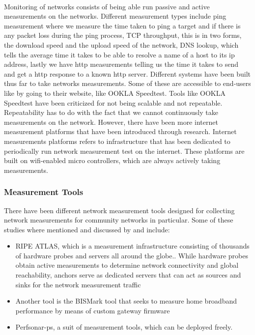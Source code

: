 \paragraph{}
Monitoring of networks consists of being able run passive and active measurements on the networks.
Different measurement types include ping measurement where we measure the time taken to ping a target and if there is any packet loss during the ping process, TCP throughput, this is in two forms, the download speed and the upload speed of the network, DNS lookup, which tells the average time it takes to be able to resolve a name of a host to its ip address, lastly we have http measurements telling us the time it takes to send and get a http response to a known http server.
Different systems have been built thus far to take networks measurements.
Some of these are accessible to end-users like by going to their website, like OOKLA Speedtest\cite{7523537}.
Tools like OOKLA Speedtest have been criticized for not being scalable and not repeatable\cite{7523537}.
Repeatability has to do with the fact that we cannot continuously take measurements on the network.
However, there have been more internet measurement platforms that have been introduced through research.
Internet measurements platforms refers to infrastructure that has been dedicated to periodically run network measurement test on the internet\cite{7076582}.
These platforms are built on wifi-enabled micro controllers, which are always actively taking measurements.
\subsubsection{Measurement Tools}\label{null:measurement-tools}
There have been different network measurement tools designed for collecting network measurements for community networks in particular.
Some of these studies where mentioned and discussed by\cite{Braem:2015:AEQ:2830629.2830639} and include:
\begin{itemize}
    \item RIPE ATLAS, which is a measurement infrastructure consisting of thousands of hardware probes and servers all around the globe.\cite{7076582, Bajpai:2015:LLU:2805789.2805796}.
    While hardware probes obtain active measurements to determine network connectivity and global reachability, anchors serve as dedicated servers that can act as sources and sinks for the network measurement traffic\cite{Bajpai:2015:LLU:2805789.2805796}
    \item Another tool is the BISMark tool that seeks to measure home broadband performance by means of custom gateway firmware\cite{Braem:2015:AEQ:2830629.2830639}
    \item Perfsonar-ps, a suit of measurement tools, which can be deployed freely\cite{Braem:2015:AEQ:2830629.2830639}.
\end{itemize}
